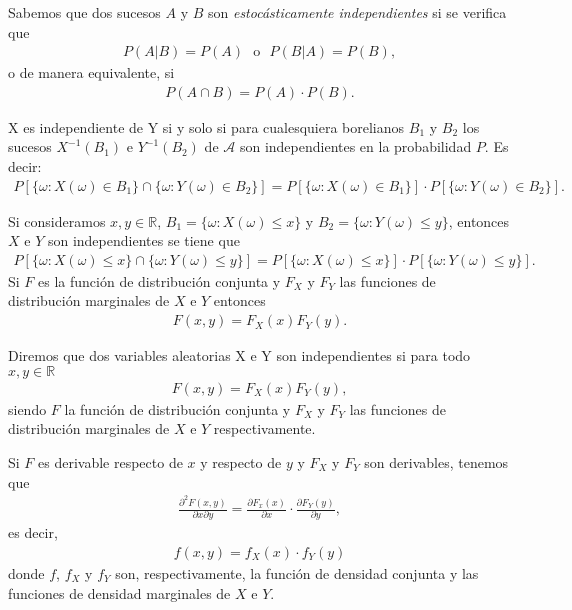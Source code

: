 Sabemos que dos sucesos $A$ y $B$ son \textit{estocásticamente independientes} si se verifica que
\begin{align*}
    P(A|B) = P(A) \ \ \ \text{o} \ \ \ P(B|A) = P(B),
\end{align*}
o de manera equivalente, si
\begin{align*}
    P(A \cap B) = P(A) \cdot P(B).
\end{align*}

\begin{defi}
X es independiente de Y si y solo si para cualesquiera borelianos $B_1$ y $B_2$ los sucesos $X^{-1}(B_1)$ e $Y^{-1}(B_2)$ de $\mathcal{A}$ son independientes en la probabilidad $P$. Es decir:
\begin{align*}
    P[\{ \omega : X(\omega) \in B_1\} \cap \{ \omega : Y(\omega) \in B_2\}] = P[\{\omega : X(\omega) \in B_1\}] \cdot P[\{\omega : Y(\omega) \in B_2\}].
\end{align*}
\end{defi}

Si consideramos $x,y \in \mathbb{R}$, $B_1 = \{ \omega : X(\omega) \leq x\}$ y $B_2 = \{ \omega : Y(\omega) \leq y\}$, entonces $X$ e $Y$ son independientes se tiene que
\begin{align*}
    P[\{ \omega : X(\omega) \leq x\} \cap \{ \omega : Y(\omega) \leq y\}] = P[\{\omega : X(\omega) \leq x\}] \cdot P[\{\omega : Y(\omega) \leq y\}].
\end{align*}
Si $F$ es la función de distribución conjunta y $F_X$ y $F_Y$ las funciones de distribución marginales de $X$ e $Y$ entonces
\begin{align*}
    F(x,y) = F_X(x)F_Y(y).
\end{align*}

\begin{defi}
Diremos que dos variables aleatorias X e Y son independientes si para todo $x,y \in \mathbb{R}$
\begin{align*}
    F(x,y) = F_X(x)F_Y(y),
\end{align*}
siendo $F$ la función de distribución conjunta y $F_X$ y $F_Y$ las funciones de distribución marginales de $X$ e $Y$ respectivamente.
\end{defi}

Si $F$ es derivable respecto de $x$ y respecto de $y$ y $F_X$ y $F_Y$ son derivables, tenemos que
\begin{align*}
    \frac{\partial^2 F(x,y)}{\partial x \partial y} = \frac{\partial F_x(x)}{\partial x} \cdot \frac{\partial F_Y(y)}{\partial y},
\end{align*}
es decir,
\begin{align*}
    f(x,y) = f_X(x) \cdot f_Y(y)
\end{align*}
donde $f$, $f_X$ y $f_Y$ son, respectivamente, la función de densidad conjunta y las funciones de densidad marginales de $X$ e $Y$.

